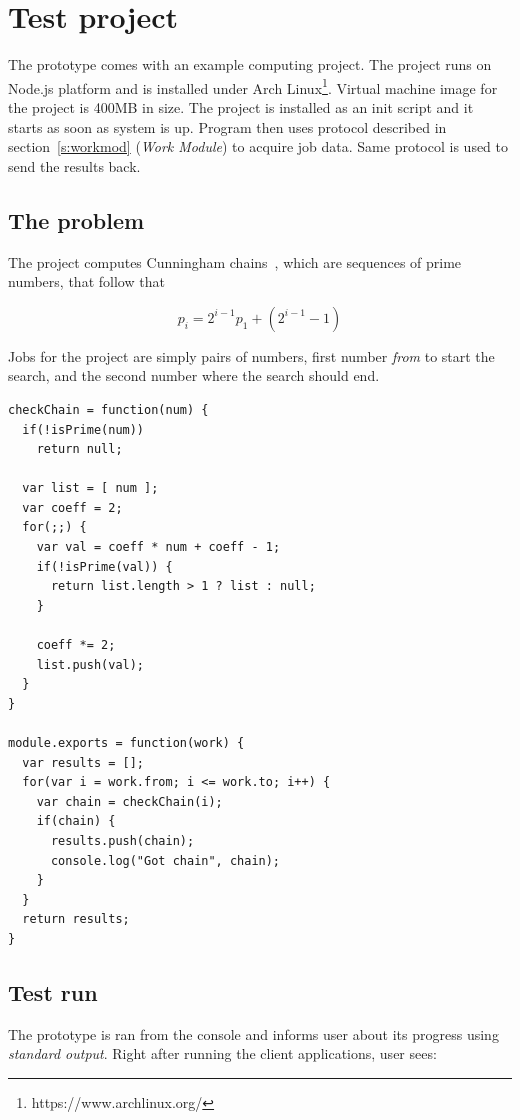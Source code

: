 \section{Test project}

The prototype comes with an example computing project. The project runs on Node.js platform and is installed under Arch Linux\footnote{https://www.archlinux.org/}. Virtual machine image for the project is 400MB in size. The project is installed as an init script and it starts as soon as system is up. Program then uses protocol described in section~\ref{s:workmod} (\emph{Work Module}) to acquire job data. Same protocol is used to send the results back.

\subsection{The problem}

The project computes Cunningham chains~\cite{andersen2005cunningham}, which are sequences of prime numbers, that follow that

\begin{equation}
p_i = 2^{i-1}p_1 + (2^{i-1}-1)
\end{equation}

Jobs for the project are simply pairs of numbers, first number \emph{from} to start the search, and the second number where the search should end.

\begin{lstlisting}[caption=Javascript code for searching Cunningham chains.]
checkChain = function(num) {
  if(!isPrime(num))
    return null;

  var list = [ num ];
  var coeff = 2;
  for(;;) {
    var val = coeff * num + coeff - 1;
    if(!isPrime(val)) {
      return list.length > 1 ? list : null;
    }

    coeff *= 2;
    list.push(val);
  }
}

module.exports = function(work) {
  var results = [];
  for(var i = work.from; i <= work.to; i++) {
    var chain = checkChain(i);
    if(chain) {
      results.push(chain);
      console.log("Got chain", chain);
    }
  }
  return results;
}
\end{lstlisting}

\subsection{Test run}

The prototype is ran from the console and informs user about its progress using \emph{standard output}. Right after running the client applications, user sees:

